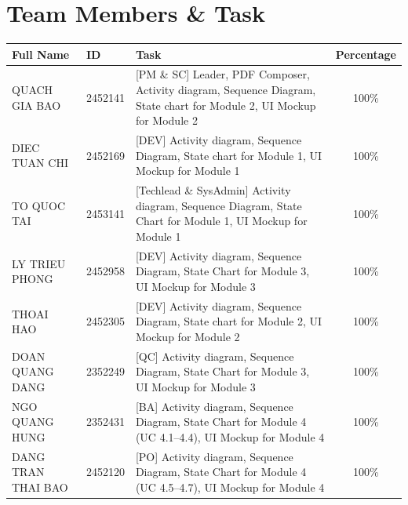 \section*{Team Members \& Task}
\begin{table}[h!]
  \centering
  \small
  \begin{tabularx}{0.95\textwidth}{llXc}
    \hline
    \textbf{Full Name} & \textbf{ID} & \textbf{Task} & \textbf{Percentage} \\
    \hline
    QUACH GIA BAO      & 2452141 & [PM \& SC] Leader, PDF Composer, Activity diagram, Sequence Diagram, State chart for Module 2, UI Mockup for Module 2 & 100\% \\
    DIEC TUAN CHI      & 2452169 & [DEV] Activity diagram, Sequence Diagram, State chart for Module 1, UI Mockup for Module 1 & 100\% \\
    TO QUOC TAI        & 2453141 & [Techlead \& SysAdmin] Activity diagram, Sequence Diagram, State Chart for Module 1, UI Mockup for Module 1 & 100\% \\
    LY TRIEU PHONG     & 2452958 & [DEV] Activity diagram, Sequence Diagram, State Chart for Module 3, UI Mockup for Module 3 & 100\% \\
    THOAI HAO          & 2452305 & [DEV] Activity diagram, Sequence Diagram, State chart for Module 2, UI Mockup for Module 2 & 100\% \\
    DOAN QUANG DANG    & 2352249 & [QC] Activity diagram, Sequence Diagram, State Chart for Module 3, UI Mockup for Module 3 & 100\% \\
    NGO QUANG HUNG     & 2352431 & [BA] Activity diagram, Sequence Diagram, State Chart for Module 4 (UC 4.1--4.4), UI Mockup for Module 4 & 100\% \\
    DANG TRAN THAI BAO & 2452120 & [PO] Activity diagram, Sequence Diagram, State Chart for Module 4 (UC 4.5--4.7), UI Mockup for Module 4 & 100\% \\
    \hline
  \end{tabularx}
  \label{tab:students_tasks}
\end{table}